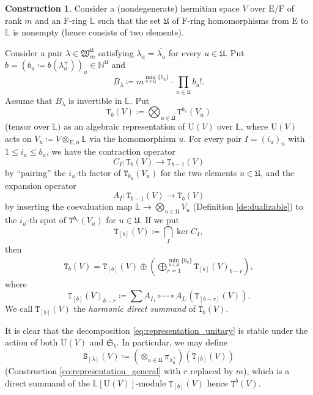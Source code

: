 \documentclass[12pt]{amsart}
\numberwithin{equation}{section}
\theoremstyle{plain}
\theoremstyle{definition}
\newtheorem{construction}[proposition]{Construction}
\theoremstyle{remark}
\renewcommand{\d}[1]{\mathbb{#1}}
\newcommand{\f}[1]{\mathfrak{#1}}
\renewcommand{\r}[1]{\mathrm{#1}}
\renewcommand{\(}{\left(}
\renewcommand{\)}{\right)}
\newcommand{\ol}[1]{\overline{#1}{}}
\renewcommand{\leq}{\leqslant}
\newcommand{\dL}{\d L}
\newcommand{\dN}{\d N}
\newcommand{\fS}{\f S}
\newcommand{\fU}{\f U}
\newcommand{\fW}{\f W}
\newcommand{\rE}{\r E}
\newcommand{\rF}{\r F}
\newcommand{\rU}{\r U}
\newcommand{\tS}{\mathtt{S}}
\newcommand{\tT}{\mathtt{T}}
\DeclareMathOperator{\Ker}{ker}
\begin{document}
\begin{construction}\label{co:representation_unitary}
Consider a (nondegenerate) hermitian space $V$ over $\rE/\rF$ of rank $m$ and an $\rF$-ring $\dL$ such that the set $\fU$ of $\rF$-ring homomorphisms from $\rE$ to $\dL$ is nonempty (hence consists of two elements).

Consider a pair $\lambda\in\fW_m^\fU$ satisfying $\lambda_{\ol{u}}=\ol{\lambda_u}$ for every $u\in\fU$. Put $b=(b_u\coloneqq b(\lambda^+_u))_u\in\dN^\fU$ and
\[
B_\lambda\coloneqq m^{\min_{u\in\fU}\{b_u\}}\cdot\prod_{u\in\fU}b_u!.
\]
Assume that $B_\lambda$ is invertible in $\dL$. Put
\[
\tT_b(V)\coloneqq\bigotimes_{u\in\fU}\tT^{b_u}(V_u)
\]
(tensor over $\dL)$ as an algebraic representation of $\rU(V)$ over $\dL$, where $\rU(V)$ acts on $V_u\coloneqq V\otimes_{E,u}\dL$ via the homomorphism $u$. For every pair $I=(i_u)_u$ with $1\leq i_u\leq b_u$, we have the contraction operator
\[
C_I\colon\tT_b(V)\to\tT_{b-1}(V)
\]
by ``pairing'' the $i_u$-th factor of $\tT_{b_u}(V_u)$ for the two elements $u\in\fU$, and the expansion operator
\[
A_I\colon\tT_{b-1}(V)\to\tT_b(V)
\]
by inserting the coevaluation map $\dL\to\bigotimes_{u\in\fU}V_u$ (Definition \ref{de:dualizable}) to the $i_u$-th spot of $\tT^{b_u}(V_u)$ for $u\in\fU$. If we put
\[
\tT_{[b]}(V)\coloneqq\bigcap_{I}\Ker C_I,
\]
then
\begin{align}\label{eq:representation_unitary}
\tT_b(V)=\tT_{[b]}(V)\oplus\(\bigoplus_{r=1}^{\min_{u\in\fU}\{b_u\}}\tT_{[b]}(V)_{b-r}\),
\end{align}
where
\[
\tT_{[b]}(V)_{b-r}\coloneqq\sum A_{I_1}\circ\cdots\circ A_{I_r}\(\tT_{[b-r]}(V)\).
\]
We call $\tT_{[b]}(V)$ the \emph{harmonic direct summand} of $\tT_b(V)$.

It is clear that the decomposition \eqref{eq:representation_unitary} is stable under the action of both $\rU(V)$ and $\fS_b$. In particular, we may define
\[
\tS_{[\lambda]}(V)\coloneqq(\otimes_{u\in\fU}\pi_{\lambda_u^+})\(\tT_{[b]}(V)\)
\]
(Construction \ref{co:representation_general} with $r$ replaced by $m$), which is a direct summand of the $\dL[\rU(V)]$-module $\tT_{[b]}(V)$ hence $\tT^{b}(V)$.
\end{construction}
\end{document}
